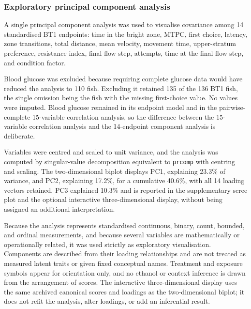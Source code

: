 \documentclass[12pt,a4paper]{article}
\begin{document}
\subsubsection{Exploratory principal component analysis}
\label{sec:pca}
A single principal component analysis was used to visualise covariance among 14 standardised BT1 endpoints: time in the bright zone, MTPC, first choice, latency, zone transitions, total distance, mean velocity, movement time, upper-stratum preference, resistance index, final flow step, attempts, time at the final flow step, and condition factor.

Blood glucose was excluded because requiring complete glucose data would have reduced the analysis to 110 fish. Excluding it retained 135 of the 136 BT1 fish, the single omission being the fish with the missing first-choice value. No values were imputed. Blood glucose remained in its endpoint model and in the pairwise-complete 15-variable correlation analysis, so the difference between the 15-variable correlation analysis and the 14-endpoint component analysis is deliberate.

Variables were centred and scaled to unit variance, and the analysis was computed by singular-value decomposition equivalent to \texttt{prcomp} with centring and scaling. The two-dimensional biplot displays PC1, explaining 23.3\% of variance, and PC2, explaining 17.2\%, for a cumulative 40.6\%, with all 14 loading vectors retained. PC3 explained 10.3\% and is reported in the supplementary scree plot and the optional interactive three-dimensional display, without being assigned an additional interpretation.

Because the analysis represents standardised continuous, binary, count, bounded, and ordinal measurements, and because several variables are mathematically or operationally related, it was used strictly as exploratory visualisation. Components are described from their loading relationships and are not treated as measured latent traits or given fixed conceptual names. Treatment and exposure symbols appear for orientation only, and no ethanol or context inference is drawn from the arrangement of scores. The interactive three-dimensional display uses the same archived canonical scores and loadings as the two-dimensional biplot; it does not refit the analysis, alter loadings, or add an inferential result.
\end{document}
